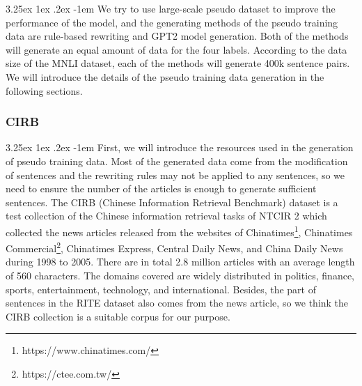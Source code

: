 \documentclass[12pt]{article}
\makeatletter
\renewcommand\paragraph{\@startsection{paragraph}{5}{\z@}%
  {3.25ex \@plus1ex \@minus.2ex}%
  {-1em}%
  {\normalfont\normalsize\bfseries}}
\makeatother
\begin{document}
\begin{CJK*}{UTF8}{bkai}
\begin{spacing}{1.77}
\paragraph{}
We try to use large-scale pseudo dataset to improve the performance of the model, and the generating methods of the pseudo training data are rule-based rewriting and GPT2 model generation. Both of the methods will generate an equal amount of data for the four labels. According to the data size of the MNLI dataset, each of the methods will generate 400k sentence pairs. We will introduce the details of the pseudo training data generation in the following sections.


\subsubsection{CIRB}
\paragraph{}
First, we will introduce the resources used in the generation of pseudo training data. Most of the generated data come from the modification of sentences and the rewriting rules may not be applied to any sentences, so we need to ensure the number of the articles is enough to generate sufficient sentences. The CIRB (Chinese Information Retrieval Benchmark)\cite{chen2001cirb} dataset is a test collection of the Chinese information retrieval tasks of NTCIR 2 which collected the news articles released from the websites of Chinatimes\footnote{https://www.chinatimes.com/}, Chinatimes Commercial\footnote{https://ctee.com.tw/}, Chinatimes Express, Central Daily News, and China Daily News during 1998 to 2005. There are in total 2.8 million articles with an average length of 560 characters. The domains covered are widely distributed in politics, finance, sports, entertainment, technology, and international. Besides, the part of sentences in the RITE dataset also comes from the news article, so we think the CIRB collection is a suitable corpus for our purpose.


\end{spacing}
\end{CJK*}
\end{document}
